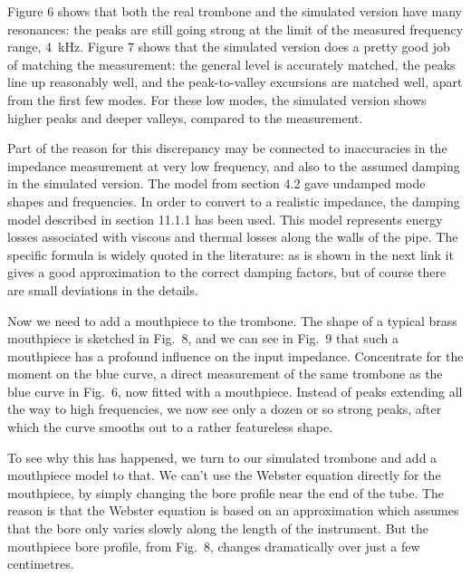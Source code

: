   Figure 6 shows that both the real trombone and the simulated version have 
  many resonances: the peaks are still going strong at the limit of the 
  measured frequency range, 4~kHz. Figure 7 shows that the simulated version 
  does a pretty good job of matching the measurement: the general level is 
  accurately matched, the peaks line up reasonably well, and the peak-to-valley 
  excursions are matched well, apart from the first few modes. For these low 
  modes, the simulated version shows higher peaks and deeper valleys, compared 
  to the measurement. 

  Part of the reason for this discrepancy may be connected to inaccuracies in 
  the impedance measurement at very low frequency, and also to the assumed 
  damping in the simulated version. The model from section 4.2 gave undamped 
  mode shapes and frequencies. In order to convert to a realistic impedance, 
  the damping model described in section 11.1.1 has been used. This model 
  represents energy losses associated with viscous and thermal losses along the 
  walls of the pipe. The specific formula is widely quoted in the literature: 
  as is shown in the next link it gives a good approximation to the correct 
  damping factors, but of course there are small deviations in the details. 

  Now we need to add a mouthpiece to the trombone. The shape of a typical brass 
  mouthpiece is sketched in Fig.\ 8, and we can see in Fig.\ 9 that such a 
  mouthpiece has a profound influence on the input impedance. Concentrate for 
  the moment on the blue curve, a direct measurement of the same trombone as 
  the blue curve in Fig.\ 6, now fitted with a mouthpiece. Instead of peaks 
  extending all the way to high frequencies, we now see only a dozen or so 
  strong peaks, after which the curve smooths out to a rather featureless 
  shape. 

  To see why this has happened, we turn to our simulated trombone and add a 
  mouthpiece model to that. We can’t use the Webster equation directly for the 
  mouthpiece, by simply changing the bore profile near the end of the tube. The 
  reason is that the Webster equation is based on an approximation which 
  assumes that the bore only varies slowly along the length of the instrument. 
  But the mouthpiece bore profile, from Fig.\ 8, changes dramatically over just 
  a few centimetres. 

